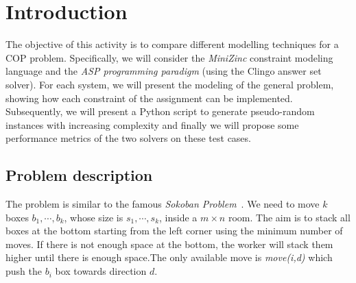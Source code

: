 \documentclass[headinclude, footinclude, abstract=on]{scrarticle}
\title{\normalfont\spacedallcaps{ANSWER SET AND \\ CONSTRAINT PROGRAMMING}}
\author{\spacedlowsmallcaps{ZANOLIN LORENZO}}
\date{}
\begin{document}
\maketitle
\thispagestyle{empty}

\begin{abstract}
COP (Constraint Optimization Problem) are problems for which we want to find an assignment for the variables in order to satisfy some \textit{constraints} and also to minimize a \textit{cost function}. The aim of this report is to solve a COP problem using \textit{Constraint Programming} and \textit{Answer Set Programming} and compare measured performances. 
\end{abstract}

\tableofcontents
\clearpage
\section{Introduction}
The objective of this activity is to compare different modelling techniques for a COP problem. Specifically, we will consider the \textit{MiniZinc} constraint modeling language and the \textit{ASP programming paradigm} (using the Clingo answer set solver). For each system, we will present the modeling of the general problem, showing how each constraint of the assignment can be implemented. Subsequently, we will present a Python script to generate pseudo-random instances with increasing complexity and finally we will propose some performance metrics of the two solvers on these test cases.

\subsection{Problem description}
The problem is similar to the famous \textit{Sokoban Problem}~\cite{sok,dovier}.
We need to move $k$ boxes $b_1,\cdots,b_k$, whose size is $s_1,\cdots,s_k$, inside a $m \times n$ room. The aim is to stack all boxes at the bottom starting from the left corner using the minimum number of moves. If there is not enough space at the bottom, the worker will stack them higher until there is enough space.The only available move is \textit{move(i,d)} which push the $b_i$ box towards direction $d$.
\end{document}
